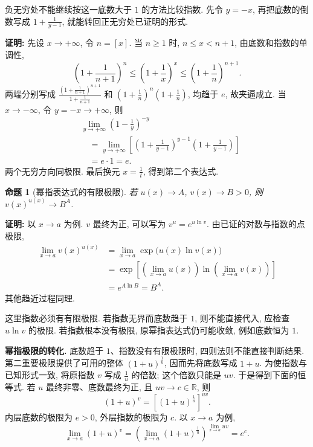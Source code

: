 \documentclass[UTF8,openany]{ctexbook}
\theoremstyle{chinesetextbook}
\newenvironment{cnproof}{\par\indent\textbf{证明:} \ignorespaces}{\par}
\newtheorem*{propositionsingle}{命题}
\begin{document}
负无穷处不能继续按这一底数大于 $1$ 的方法比较指数. 先令 $y=-x$, 再把底数的倒数写成 $\displaystyle1+\frac1{y-1}$, 就能转回正无穷处已证明的形式.

\begin{cnproof}
先设 $x\to+\infty$, 令 $n=[x]$. 当 $n\ge1$ 时, $n\le x<n+1$, 由底数和指数的单调性,
\[
\left(1+\frac1{n+1}\right)^n
\le\left(1+\frac1x\right)^x
\le\left(1+\frac1n\right)^{n+1}.
\]
两端分别写成 $\displaystyle \frac{(1+\frac1{n+1})^{n+1}}{1+\frac1{n+1}}$ 和 $\displaystyle (1+\frac1n)^n(1+\frac1n)$, 均趋于 $e$, 故夹逼成立. 当 $x\to-\infty$, 令 $y=-x\to+\infty$, 则
\[
\begin{aligned}
&\lim_{y\to+\infty}\left(1-\frac1y\right)^{-y}\\
&\quad=\lim_{y\to+\infty}\left[\left(1+\frac1{y-1}\right)^{y-1}\left(1+\frac1{y-1}\right)\right]\\
&\quad=e\cdot1=e.
\end{aligned}
\]
两个无穷方向同极限. 最后换元 $\displaystyle x=\frac1t$, 得到第二个表达式.
\end{cnproof}
\begin{propositionsingle}[幂指表达式的有限极限]
若 $u(x)\to A$, $v(x)\to B>0$, 则 $v(x)^{u(x)}\to B^A$.
\end{propositionsingle}
\begin{cnproof}
以 $x\to a$ 为例. $v$ 最终为正, 可以写为 $v^u=e^{u\ln v}$. 由已证的对数与指数的点极限,
\[
\begin{aligned}
\lim_{x\to a}v(x)^{u(x)}
&=\lim_{x\to a}\exp\bigl(u(x)\ln v(x)\bigr)\\
&=\exp\left[\left(\lim_{x\to a}u(x)\right)
\ln\left(\lim_{x\to a}v(x)\right)\right]\\
&=e^{A\ln B}=B^A.
\end{aligned}
\]
其他趋近过程同理.
\end{cnproof}
这里指数必须有有限极限. 若指数无界而底数趋于 $1$, 则不能直接代入, 应检查 $u\ln v$ 的极限. 若指数根本没有极限, 原幂指表达式仍可能收敛, 例如底数恒为 $1$.
\par\indent\textbf{幂指极限的转化.} 底数趋于 $1$、指数没有有限极限时, 四则法则不能直接判断结果. 第二重要极限提供了可用的整体 $\displaystyle(1+u)^{\frac1u}$, 因而先将底数写成 $1+u$. 为使指数与已知形式一致, 将原指数 $v$ 写成 $\displaystyle\frac1u$ 的倍数; 这个倍数只能是 $uv$. 于是得到下面的恒等式. 若 $u$ 最终非零、底数最终为正, 且 $uv\to c\in\mathbb R$, 则
\[
(1+u)^v=\left[(1+u)^{\frac1u}\right]^{uv}.
\]
内层底数的极限为 $e>0$, 外层指数的极限为 $c$. 以 $x\to a$ 为例,
\[
\lim_{x\to a}(1+u)^v=\left(\lim_{x\to a}(1+u)^{\frac1u}\right)^{\lim_{x\to a}uv}=e^c.
\]
\end{document}
